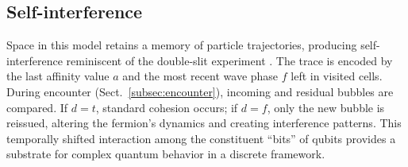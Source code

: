 \documentclass[a4paper]{article}
\begin{document}
\subsection{Self-interference\label{subsec:Interference}}
Space in this model retains a memory of particle trajectories, producing self-interference reminiscent of the double-slit experiment \cite{feynman-2}. The trace is encoded by the last affinity value $a$ and the most recent wave phase $f$ left in visited cells.
During encounter (Sect.~\ref{subsec:encounter}), incoming and residual bubbles are compared. If $d=t$, standard cohesion occurs; if $d=f$, only the new bubble is reissued, altering the fermion's dynamics and creating interference patterns. This temporally shifted interaction among the constituent ``bits'' of qubits provides a substrate for complex quantum behavior in a discrete framework.
\end{document}
